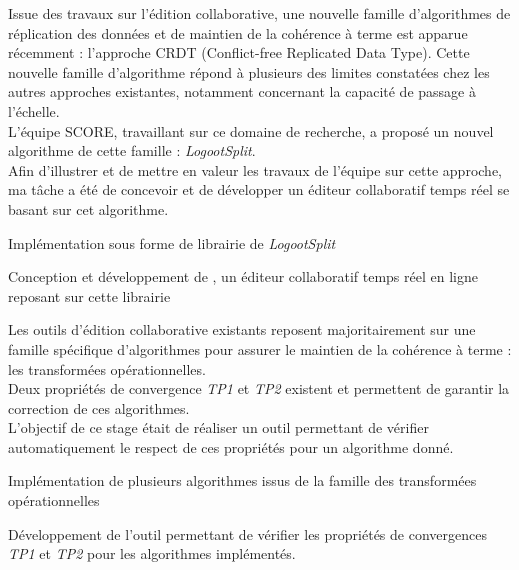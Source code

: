 \hfill\begin{minipage}{\dimexpr\textwidth-0.5cm}
Issue des travaux sur l'édition collaborative, une nouvelle famille d'algorithmes de réplication des données
et de maintien de la cohérence à terme est apparue récemment : l'approche CRDT (Conflict-free Replicated Data Type).
Cette nouvelle famille d'algorithme répond à plusieurs des limites constatées chez les autres approches existantes,
notamment concernant la capacité de passage à l'échelle.
\\
L'équipe SCORE, travaillant sur ce domaine de recherche, a proposé un nouvel algorithme de cette famille : \emph{LogootSplit}.
\\
Afin d'illustrer et de mettre en valeur les travaux de l'équipe sur cette approche,
ma tâche a été de concevoir et de développer un éditeur collaboratif temps réel se basant sur cet algorithme.
\begin{tightemize}
\item Implémentation sous forme de librairie de \emph{LogootSplit}
\item Conception et développement de \href{https://www.coedit.re}{}, un éditeur collaboratif temps réel en ligne reposant sur cette librairie
\end{tightemize}
\sectionsep\xdef\tpd{\the\prevdepth}
\end{minipage}

\sectionsep

\hfill\begin{minipage}{\dimexpr\textwidth-0.5cm}
Les outils d'édition collaborative existants reposent majoritairement sur une famille spécifique d'algorithmes
pour assurer le maintien de la cohérence à terme : les transformées opérationnelles.
\\
Deux propriétés de convergence \emph{TP1} et \emph{TP2} existent et permettent de garantir la correction de ces algorithmes.
\\
L'objectif de ce stage était de réaliser un outil permettant de vérifier automatiquement le respect de ces propriétés pour un algorithme donné.
\begin{tightemize}
\item Implémentation de plusieurs algorithmes issus de la famille des transformées opérationnelles
\item Développement de l'outil permettant de vérifier les propriétés de convergences \emph{TP1} et \emph{TP2} pour les algorithmes implémentés.
\end{tightemize}
\sectionsep\xdef\tpd{\the\prevdepth}
\end{minipage}

